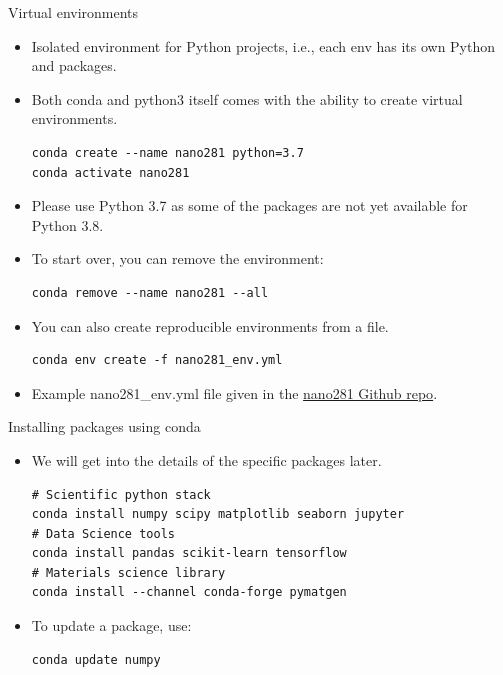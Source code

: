 \documentclass[aspectratio=169]{beamer}
\begin{document}
\begin{frame}[fragile]{Virtual environments}
    \begin{itemize}
        \item Isolated environment for Python projects, i.e., each env has its own Python and packages.
        \item Both conda and python3 itself comes with the ability to create virtual environments.
        \begin{verbatim}
conda create --name nano281 python=3.7
conda activate nano281
        \end{verbatim}
        \item Please use Python 3.7 as some of the packages are not yet available for Python 3.8.
        \item To start over, you can remove the environment:
        \begin{verbatim}
conda remove --name nano281 --all
        \end{verbatim}
        \item You can also create reproducible environments from a file.
        \begin{verbatim}
conda env create -f nano281_env.yml
        \end{verbatim}
        \item Example nano281\_env.yml file given in the \href{https://github.com/materialsvirtuallab/nano281}{nano281 Github repo}.
    \end{itemize}
\end{frame}


\begin{frame}[fragile]{Installing packages using conda}
    \begin{itemize}
        \item We will get into the details of the specific packages later.
    \begin{verbatim}
# Scientific python stack
conda install numpy scipy matplotlib seaborn jupyter
# Data Science tools
conda install pandas scikit-learn tensorflow
# Materials science library
conda install --channel conda-forge pymatgen
    \end{verbatim}
        \item To update a package, use:
    \begin{verbatim}
conda update numpy
    \end{verbatim}
    \end{itemize}
\end{frame}
\end{document}
